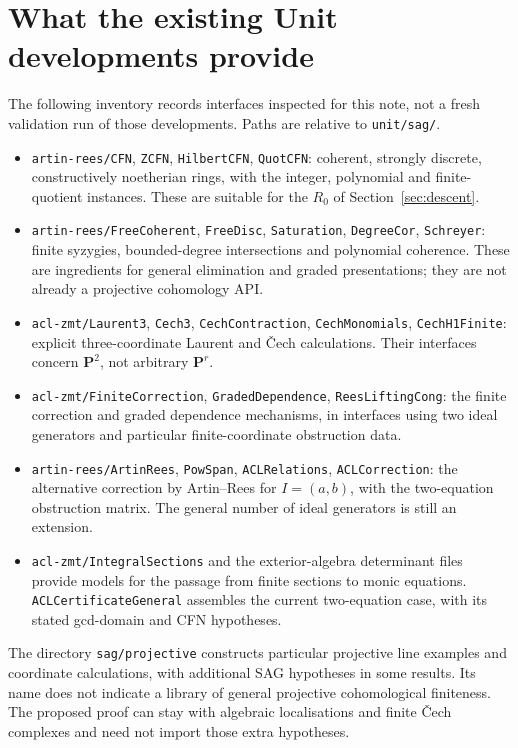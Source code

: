 \documentclass[11pt]{amsart}
\theoremstyle{definition}
\theoremstyle{remark}
\newcommand{\PP}{\mathbf P}
\newcommand{\code}[1]{\texttt{#1}}
\begin{document}
\section{What the existing Unit developments provide}

The following inventory records interfaces inspected for this note,
not a fresh validation run of those developments. Paths are relative
to \code{unit/sag/}.

\begin{itemize}
\item \code{artin-rees/CFN}, \code{ZCFN}, \code{HilbertCFN},
\code{QuotCFN}: coherent, strongly discrete, constructively noetherian
rings, with the integer, polynomial and finite-quotient instances.
These are suitable for the $R_0$ of Section~\ref{sec:descent}.
\item \code{artin-rees/FreeCoherent}, \code{FreeDisc},
\code{Saturation}, \code{DegreeCor}, \code{Schreyer}:
finite syzygies, bounded-degree intersections and polynomial
coherence. These are ingredients for general elimination and graded
presentations; they are not already a projective cohomology API.
\item \code{acl-zmt/Laurent3}, \code{Cech3},
\code{CechContraction}, \code{CechMonomials},
\code{CechH1Finite}: explicit three-coordinate Laurent and \v Cech
calculations. Their interfaces concern $\PP^2$, not arbitrary $\PP^r$.
\item \code{acl-zmt/FiniteCorrection}, \code{GradedDependence},
\code{ReesLiftingCong}: the finite correction and graded dependence
mechanisms, in interfaces using two ideal generators and particular
finite-coordinate obstruction data.
\item \code{artin-rees/ArtinRees}, \code{PowSpan},
\code{ACLRelations}, \code{ACLCorrection}: the alternative correction
by Artin--Rees for $I=(a,b)$, with the two-equation obstruction matrix.
The general number of ideal generators is still an extension.
\item \code{acl-zmt/IntegralSections} and the exterior-algebra
determinant files provide models for the passage from finite sections
to monic equations. \code{ACLCertificateGeneral} assembles the current
two-equation case, with its stated gcd-domain and CFN hypotheses.
\end{itemize}

The directory \code{sag/projective} constructs particular projective
line examples and coordinate calculations, with additional SAG
hypotheses in some results. Its name does not indicate a library of
general projective cohomological finiteness. The proposed proof can
stay with algebraic localisations and finite \v Cech complexes and
need not import those extra hypotheses.
\end{document}
